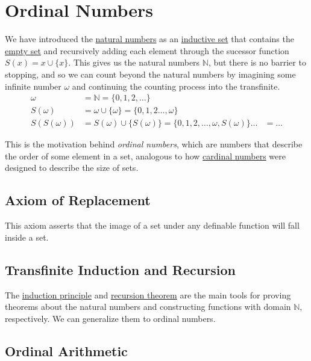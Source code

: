 \section{Ordinal Numbers} 

  We have introduced the \hyperref[def:naturals]{natural numbers} as an \hyperref[def:inductive-set]{inductive set} that contains the \hyperref[def:empty-set]{empty set} and recursively adding each element through the sucessor function $S(x) = x \cup \{x\}$. This gives us the natural numbers $\mathbb{N}$, but there is no barrier to stopping, and so we can count beyond the natural numbers by imagining some infinite number $\omega$ and continuing the counting process into the transfinite. 
  \begin{align}
    \omega & = \mathbb{N} = \{0, 1, 2, \ldots \} \\ 
    S(\omega) & = \omega \cup \{\omega\} = \{0, 1, 2 \ldots, \omega\} \\
    S(S(\omega)) & = S(\omega) \cup \{S(\omega)\} = \{0, 1, 2, \ldots, \omega, S(\omega)\}
    \ldots & = \ldots 
  \end{align}

  This is the motivation behind \textit{ordinal numbers}, which are numbers that describe the order of some element in a set, analogous to how \hyperref[def:cardinal-numbers]{cardinal numbers} were designed to describe the size of sets. 

\subsection{Axiom of Replacement}

  \begin{axiom}
    \label{thm:axiom-schema-of-replacement}
    This axiom asserts that the image of a set under any definable function will fall inside a set. 
  \end{axiom}

\subsection{Transfinite Induction and Recursion} 

  The \hyperref[thm:induction-principle]{induction principle} and \hyperref[thm:recursion-theorem]{recursion theorem} are the main tools for proving theorems about the natural numbers and constructing functions with domain $\mathbb{N}$, respectively. We can generalize them to ordinal numbers. 

\subsection{Ordinal Arithmetic} 




